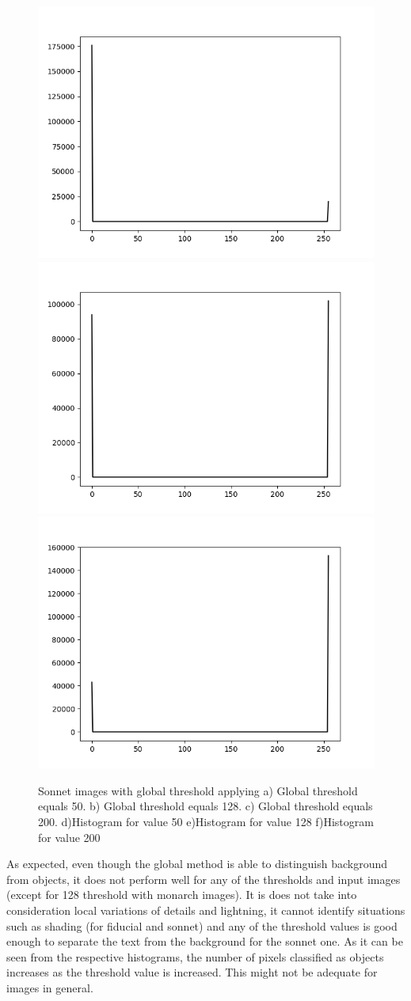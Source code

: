 \documentclass[]{IEEEtran}
\begin{document}
\begin{figure}[H]
  \includegraphics[width=0.3\hsize]{images/global-thresholding/50-threshold/sonnethistogram.png}
  \includegraphics[width=0.3\hsize]{images/global-thresholding/128-threshold/sonnethistogram.png}
  \includegraphics[width=0.3\hsize]{images/global-thresholding/200-threshold/sonnethistogram.png}
  \caption{Sonnet images with global threshold applying a) Global threshold equals 50. b) Global threshold equals 128. c) Global threshold equals 200. d)Histogram for value 50 e)Histogram for value 128 f)Histogram for value 200}
  \label{fig:global-sonnet}
\end{figure}

As expected, even though the global method is able to distinguish background from objects, it does not perform well for any of the thresholds and input images (except for 128 threshold with monarch images). It is does not take into consideration local variations of details and lightning, it cannot identify situations such as shading (for fiducial and sonnet) and any of the threshold values is good enough to separate the text from the background for the sonnet one. As it can be seen from the respective histograms, the number of pixels classified as objects increases as the threshold value is increased. This might not be adequate for images in general.
\end{document}
